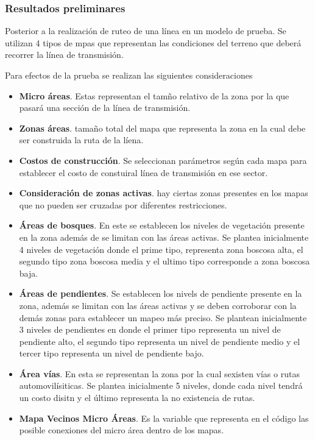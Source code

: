 \documentclass[
  letterpaper,
  DIV=11,
  numbers=noendperiod]{scrartcl}
\providecommand{\tightlist}{%
  \setlength{\itemsep}{0pt}\setlength{\parskip}{0pt}}\usepackage{longtable,booktabs,array}
\begin{document}
\hypertarget{resultados-preliminares}{%
\subsubsection{Resultados preliminares}\label{resultados-preliminares}}

Posterior a la realización de ruteo de una línea en un modelo de prueba.
Se utilizan 4 tipos de mpas que representan las condiciones del terreno
que deberá recorrer la línea de transmisión.

Para efectos de la prueba se realizan las siguientes consideraciones

\begin{itemize}
\tightlist
\item
  \textbf{Micro áreas}. Estas representan el tamño relativo de la zona
  por la que pasará una sección de la línea de transmisión.
\item
  \textbf{Zonas áreas}. tamaño total del mapa que representa la zona en
  la cual debe ser construida la ruta de la líena.
\item
  \textbf{Costos de construcción}. Se seleccionan parámetros según cada
  mapa para establecer el costo de constuiral línea de transmisión en
  ese sector.
\item
  \textbf{Consideración de zonas activas}. hay ciertas zonas presentes
  en los mapas que no pueden ser cruzadas por diferentes restricciones.
\item
  \textbf{Áreas de bosques}. En este se establecen los niveles de
  vegetación presente en la zona además de se limitan con las áreas
  activas. Se plantea inicialmente 4 niveles de vegetación donde el
  prime tipo, representa zona boscosa alta, el segundo tipo zona boscosa
  media y el ultimo tipo corresponde a zona boscosa baja.
\item
  \textbf{Áreas de pendientes}. Se establecen los nivels de pendiente
  presente en la zona, además se limitan con las áreas activas y se
  deben corroborar con la demás zonas para establecer un mapeo más
  preciso. Se plantean inicialmente 3 niveles de pendientes en donde el
  primer tipo representa un nivel de pendiente alto, el segundo tipo
  representa un nivel de pendiente medio y el tercer tipo representa un
  nivel de pendiente bajo.
\item
  \textbf{Área vías}. En esta se representan la zona por la cual
  sexisten vías o rutas automovilísiticas. Se plantea inicialmente 5
  niveles, donde cada nivel tendrá un costo disitn y el último
  representa la no existencia de rutas.
\item
  \textbf{Mapa Vecinos Micro Áreas}. Es la variable que representa en el
  código las posible conexiones del micro área dentro de los mapas.
\end{itemize}
\end{document}
